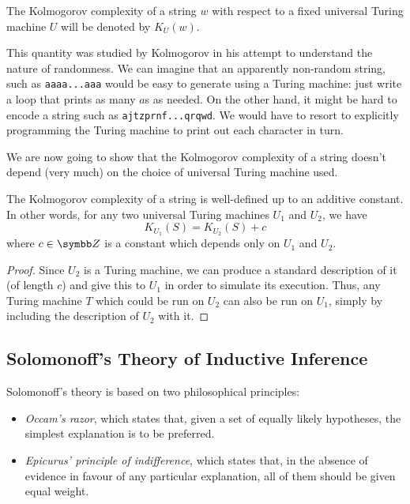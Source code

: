 The Kolmogorov complexity of a string \(w\) with respect to a fixed universal Turing machine \(U\) will be denoted by \(K_{U} \left(w\right)\).

This quantity was studied by Kolmogorov in his attempt to understand the nature of randomness. We can imagine that an apparently non-random string, such as \texttt{aaaa...aaa} would be easy to generate using a Turing machine: just write a loop that prints as many \(a\)s as needed. On the other hand, it might be hard to encode a string such as \texttt{ajtzprnf...qrqwd}. We would have to resort to explicitly programming the Turing machine to print out each character in turn.

We are now going to show that the Kolmogorov complexity of a string doesn't depend (very much) on the choice of universal Turing machine used.

\begin{theorem}[Invariance]
The Kolmogorov complexity of a string is well-defined up to an additive constant. In other words, for any two universal Turing machines \(U_1\) and \(U_2\), we have
\[
    K_{U_1} \left(S\right) = K_{U_2} \left(S\right) + c
\]
where \(c \in \integers\) is a constant which depends only on \(U_1\) and \(U_2\).
\end{theorem}
\begin{proof}
Since \(U_2\) is a Turing machine, we can produce a standard description of it (of length \(c\)) and give this to \(U_1\) in order to simulate its execution. Thus, any Turing machine \(T\) which could be run on \(U_2\) can also be run on \(U_1\), simply by including the description of \(U_2\) with it.
\end{proof}

\subsection{Solomonoff's Theory of Inductive Inference}

Solomonoff's theory is based on two philosophical principles:
\begin{itemize}
    \item \emph{Occam's razor}, which states that, given a set of equally likely hypotheses, the simplest explanation is to be preferred.
    \item \emph{Epicurus' principle of indifference}, which states that, in the absence of evidence in favour of any particular explanation, all of them should be given equal weight.
\end{itemize}

